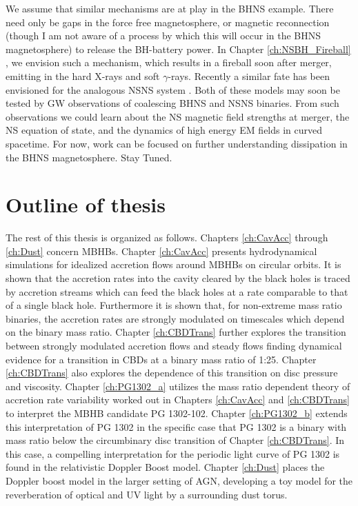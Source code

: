 We assume that similar mechanisms are at play in the BHNS example. There need
only be gaps in the force free magnetosphere, or magnetic reconnection (though
I am not aware of a process by which this will occur in the BHNS magnetosphere) to
release the BH-battery power. In Chapter \ref{ch:NSBH_Fireball}
\citep{DL:2016}, we envision such a mechanism, which results in a fireball
soon after merger, emitting in the hard X-rays and soft $\gamma$-rays. Recently
a similar fate has been envisioned for the analogous NSNS system
\citep{MetzgerNSNS:2016}. Both of these models may soon be
tested by GW observations of coalescing BHNS and NSNS binaries. From such
observations we could learn about the NS magnetic field strengths at merger,
the NS equation of state, and the dynamics of high energy EM fields in curved
spacetime. For now, work can be focused on further understanding dissipation
in the BHNS magnetosphere. Stay Tuned.











\section{Outline of thesis}   

The rest of this thesis is organized as follows. Chapters \ref{ch:CavAcc}
through \ref{ch:Dust} concern MBHBs. Chapter \ref{ch:CavAcc} presents
hydrodynamical simulations for idealized accretion flows around MBHBs on
circular orbits. It is shown that the accretion rates into the cavity cleared
by the black holes is traced by accretion streams which can feed the black
holes at a rate comparable to that of a single black hole. Furthermore it is
shown that, for non-extreme mass ratio binaries, the accretion rates are
strongly modulated on timescales which depend on the binary mass ratio.
Chapter \ref{ch:CBDTrans} further explores the transition between strongly
modulated accretion flows and steady flows finding dynamical evidence for a
transition in CBDs at a binary mass ratio of 1:25. Chapter \ref{ch:CBDTrans}
also explores the dependence of this transition on disc pressure and
viscosity. Chapter \ref{ch:PG1302_a} utilizes the mass ratio dependent theory
of accretion rate variability worked out in Chapters \ref{ch:CavAcc} and
\ref{ch:CBDTrans} to interpret the MBHB candidate PG 1302-102. Chapter
\ref{ch:PG1302_b} extends this interpretation of PG 1302 in the specific case
that PG 1302 is a binary with mass ratio below the circumbinary disc transition of Chapter
\ref{ch:CBDTrans}. In this case, a compelling interpretation for the periodic
light curve of PG 1302 is found in the relativistic Doppler Boost model.
Chapter \ref{ch:Dust} places the Doppler boost model in the larger setting of
AGN, developing a toy model for the reverberation of optical and UV light by a
surrounding dust torus. 

